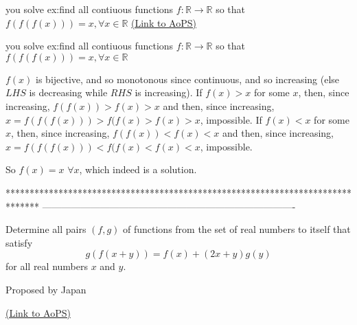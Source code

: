 \begin{problem}
	you solve ex:find all contiuous functions $f:\mathbb{R}\to\mathbb{R}$ so that
$f\left(f\left(f\left(x\right)\right)\right)=x,\forall x\in\mathbb{R}$
	\flushright \href{https://artofproblemsolving.com/community/c6h488303}{(Link to AoPS)}
\end{problem}



\begin{solution}
	\begin{tcolorbox}you solve ex:find all contiuous functions $f:\mathbb{R}\to\mathbb{R}$ so that
$f\left(f\left(f\left(x\right)\right)\right)=x,\forall x\in\mathbb{R}$\end{tcolorbox}
$f(x)$ is bijective, and so monotonous since continuous, and so increasing (else $LHS$ is decreasing while $RHS$ is increasing).
If $f(x)>x$ for some $x$, then, since increasing, $f(f(x))>f(x)>x$ and then, since increasing, $x=f(f(f(x)))>f(f(x)>f(x)>x$, impossible.
If $f(x)<x$ for some $x$, then, since increasing, $f(f(x))<f(x)<x$ and then, since increasing, $x=f(f(f(x)))<f(f(x)<f(x)<x$, impossible.

So $\boxed{f(x)=x}$ $\forall x$, which indeed is a solution.
\end{solution}
*******************************************************************************
-------------------------------------------------------------------------------

\begin{problem}
	Determine all pairs $(f,g)$ of functions from the set of real numbers to itself that satisfy \[g(f(x+y)) = f(x) + (2x + y)g(y)\] for all real numbers $x$ and $y$.

\begin{italicized}Proposed by Japan\end{italicized}
	\flushright \href{https://artofproblemsolving.com/community/c6h488535}{(Link to AoPS)}
\end{problem}



